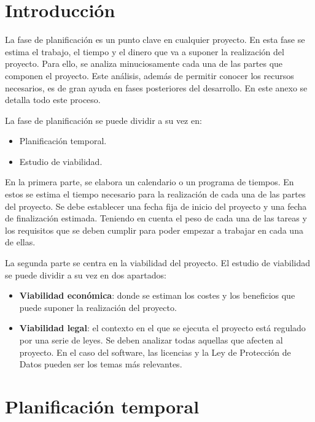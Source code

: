 
\section{Introducción}\label{introduccion-plan}

La fase de planificación es un punto clave en cualquier proyecto. En
esta fase se estima el trabajo, el tiempo y el dinero que va a suponer
la realización del proyecto. Para ello, se analiza minuciosamente cada
una de las partes que componen el proyecto. Este análisis, además de
permitir conocer los recursos necesarios, es de gran ayuda en fases
posteriores del desarrollo. En este anexo se detalla todo este proceso.

La fase de planificación se puede dividir a su vez en:

\begin{itemize}
\tightlist
\item
  Planificación temporal.
\item
  Estudio de viabilidad.
\end{itemize}

En la primera parte, se elabora un calendario o un programa de tiempos.
En estos se estima el tiempo necesario para la realización de cada una
de las partes del proyecto. Se debe establecer una fecha fija de inicio
del proyecto y una fecha de finalización estimada. Teniendo en cuenta el
peso de cada una de las tareas y los requisitos que se deben cumplir
para poder empezar a trabajar en cada una de ellas.

La segunda parte se centra en la viabilidad del proyecto. El estudio de
viabilidad se puede dividir a su vez en dos apartados:

\begin{itemize}
\tightlist
\item
  \textbf{Viabilidad económica}: donde se estiman los costes y los beneficios que
  puede suponer la realización del proyecto.
\item
  \textbf{Viabilidad legal}: el contexto en el que se ejecuta el proyecto está
  regulado por una serie de leyes. Se deben analizar todas aquellas que
  afecten al proyecto. En el caso del software, las licencias y la Ley
  de Protección de Datos pueden ser los temas más relevantes.
\end{itemize}

\section{Planificación temporal}\label{planificacion-temporal}

